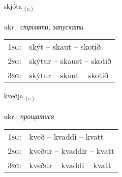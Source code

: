 \documentclass[frontgrid, backgrid]{flacards}\usepackage[]{graphicx}\usepackage[]{xcolor}
\begin{document}
\renewcommand{\blhead}{\vskip5pt {\small\bfseries\footnotesize Sagnorð | дієслово }}
\renewcommand{\bcfoot}{\vskip5pt \hspace{2pt}{\small\bfseries\footnotesize 1K}}


{skjóta \small{\textsubscript{(\textit{v.})}} \\[1ex] %
\textphonetic{[scouːta]} \\
ukr.: \emph{стріляти; запускати} \\  [2ex]
\renewcommand*{\arraystretch}{0.8}
\begin{tabular}{p{1cm}l}
\textsc{1sg}: & skýt -- skaut -- skotið \\ 
\textsc{2sg}: & skýtur -- skaust -- skotið \\ 
\textsc{3sg}: & skýtur -- skaut -- skotið \\ 
\end{tabular}
}

\renewcommand{\flhead}{\vskip5pt \fboxsep=0pt {\small\bfseries\footnotesize Sagnorð | дієслово}}
\renewcommand{\fcfoot}{\vskip5pt \fboxsep=0pt \hspace{2pt}{\small\bfseries\footnotesize 1K}}

\renewcommand{\blhead}{\vskip5pt {\small\bfseries\footnotesize Sagnorð | дієслово }}
\renewcommand{\bcfoot}{\vskip5pt \hspace{2pt}{\small\bfseries\footnotesize 1K}}


{kveðja \small{\textsubscript{(\textit{v.})}} \\[1ex] %
\textphonetic{[kʰvɛðja]} \\
ukr.: \emph{прощатися} \\  [2ex]
\renewcommand*{\arraystretch}{0.8}
\begin{tabular}{p{1cm}l}
\textsc{1sg}: & kveð -- kvaddi -- kvatt \\ 
\textsc{2sg}: & kveður -- kvaddir -- kvatt \\ 
\textsc{3sg}: & kveður -- kvaddi -- kvatt \\ 
\end{tabular}
}
\end{document}

